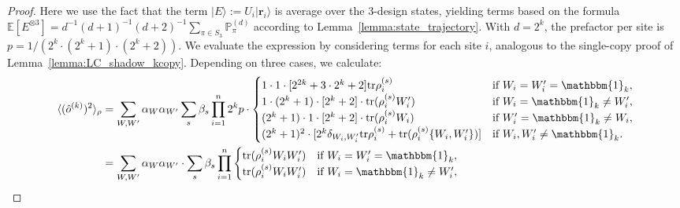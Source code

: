 \documentclass[aps,%
twocolumn,%
floatfix,%
pra,%
amsfonts,%
groupedaddress,%
superscriptaddress]{revtex4-2}%
\newcommand{\ket}[1]{\lvert #1\rangle}
\newcommand{\1}{\mathbbm{1}}
\begin{document}
\begin{proof}
    Here we use the fact that the term $\ket{E} :=U_i\ket{\mathbf{r}_i}$ is average over the 3-design states, yielding terms based on the formula $\mathbb{E} [E^{\otimes 3}] ={d^{-1}(d+1)^{-1}(d+2)^{-1}} \sum_{\pi \in S_3} \mathbb{P}_{\pi}^{(d)}$ according to Lemma~\ref{lemma:state_trajectory}. With $d=2^k$, the prefactor per site is $p = 1/(2^k \cdot (2^k+1) \cdot (2^k+2))$.  We evaluate the expression by considering terms for each site $i$, analogous to the single-copy proof of Lemma~\ref{lemma:LC_shadow_kcopy}. Depending on three cases, we calculate:
    \begin{align*}
        \langle (\hat{o}^{(k)})^2 \rangle_{\rho} &=
        \sum_{W,W'}\alpha_{W}\alpha_{W'}\sum_{s}\beta_s\prod_{i = 1}^n 2^k p \cdot \begin{cases}
         1\cdot 1\cdot [2^{2k}+3\cdot 2^k+2]\text{tr}{\rho}^{(s)}_i  &\text{if~} W_i=W_i' = \1_k,\\
         1 \cdot (2^k+1) \cdot[2^k + 2]\cdot \text{tr}({\rho}^{(s)}_i W'_i)&\text{if~} W_i = \1_k \neq W'_i,\\
         (2^k+1) \cdot 1 \cdot[2^k + 2]\cdot \text{tr}({\rho}^{(s)}_i W_i)&\text{if~} W'_i = \1_k \neq W_i,\\
         (2^k+1)^2 \cdot[2^k\delta_{W_i, W'_i}\text{tr}{\rho}^{(s)}_i  + \text{tr}({\rho}^{(s)}_i\{W_i,W_i'\})]&\text{if~} W_i, W'_i \neq \1_k.
     \end{cases}\\
     &= \sum_{W,W'}\alpha_{W}\alpha_{W'}\cdot \sum_{s}\beta_s\prod_{i = 1}^n \begin{cases}
        \text{tr}({\rho}^{(s)}_i W_iW'_i)  &\text{if~} W_i=W_i' = \1_k,\\
         \text{tr}({\rho}^{(s)}_i W_i W'_i)&\text{if~} W_i = \1_k\neq W'_i,\\

\end{cases}
\end{align*}
\end{proof}
\end{document}
